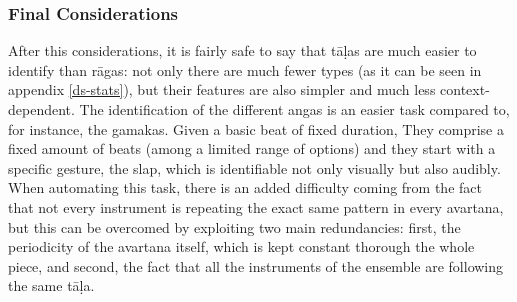 \subsubsection{Final Considerations}

After this considerations, it is fairly safe to say that t\=a\d{l}as are much easier to identify than r\=agas: not only there are much fewer types (as it can be seen in appendix \ref{ds-stats}), but their features are also simpler and much less context-dependent. The identification of the different angas is an easier task compared to, for instance, the gamakas. Given a basic beat of fixed duration, They comprise a fixed amount of beats (among a limited range of options) and they start with a specific gesture, the slap, which is identifiable not only visually but also audibly. When automating this task, there is an added difficulty coming from the fact that not every instrument is repeating the exact same pattern in every avartana, but this can be overcomed by exploiting two main redundancies: first, the periodicity of the avartana itself, which is kept constant thorough the whole piece, and second, the fact that all the instruments of the ensemble are following the same t\=a\d{l}a.
